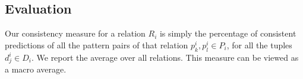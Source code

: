 
\subsection{Evaluation}
\label{sec:eval}


Our consistency measure for a relation $R_i$ is simply the
percentage of consistent predictions of all the pattern pairs
of that relation $p_k^i,p_l^i \in P_i$, for all the tuples
$d_j^i \in D_i$.
We
report the
average over all relations. This measure can be viewed as a macro
average.


